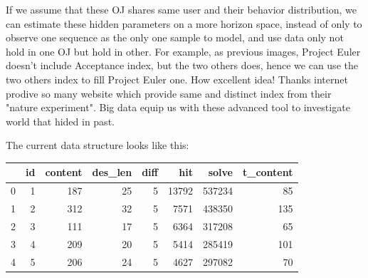 \documentclass{beamer}
\begin{document}
\begin{frame}

If we assume that these OJ shares same user and their behavior distribution, 
we can estimate these hidden parameters on a more horizon space, instead of only to observe one sequence 
as the only one sample to model, and use data only not hold in one OJ but hold in other. For example, 
as previous images, Project Euler doesn't include Acceptance index, but the two others does, hence we can use the two
others index to fill Project Euler one. How excellent idea! Thanks internet prodive so many website which 
provide same and distinct index from their "nature experiment". Big data equip us with these advanced tool
to investigate world that hided in past.

The current data structure looks like this:

\begin{tabular}{lrrrrrrr}
\toprule
{} &  id &  content &  des\_len &  diff &    hit &   solve &  t\_content \\
\midrule
0 &   1 &      187 &       25 &     5 &  13792 &  537234 &         85 \\
1 &   2 &      312 &       32 &     5 &   7571 &  438350 &        135 \\
2 &   3 &      111 &       17 &     5 &   6364 &  317208 &         65 \\
3 &   4 &      209 &       20 &     5 &   5414 &  285419 &        101 \\
4 &   5 &      206 &       24 &     5 &   4627 &  297082 &         70 \\
\bottomrule
\end{tabular}

\end{frame}
\end{document}
